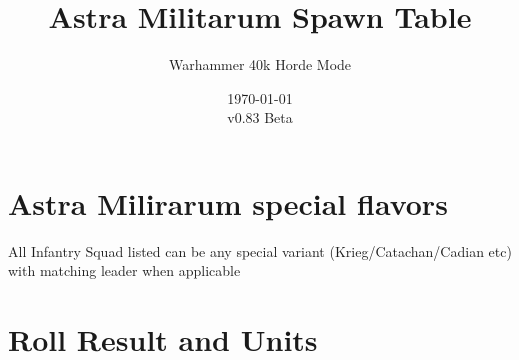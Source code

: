 \documentclass{HordeModeTarot}
\title{Astra Militarum Spawn Table}
\author{Warhammer 40k Horde Mode}
\date{\today \\v0.83 Beta}
\begin{document}
\maketitle

\section{Astra Milirarum special flavors}\hypertarget{special-rule}{}\label{special-rule}

All Infantry Squad listed can be any special variant (Krieg/Catachan/Cadian etc) with matching leader when applicable
\outputUsingSpawnTableBoilerplate

\section{Roll Result and Units}\hypertarget{roll-results}{}\label{roll-results}
\end{document}
